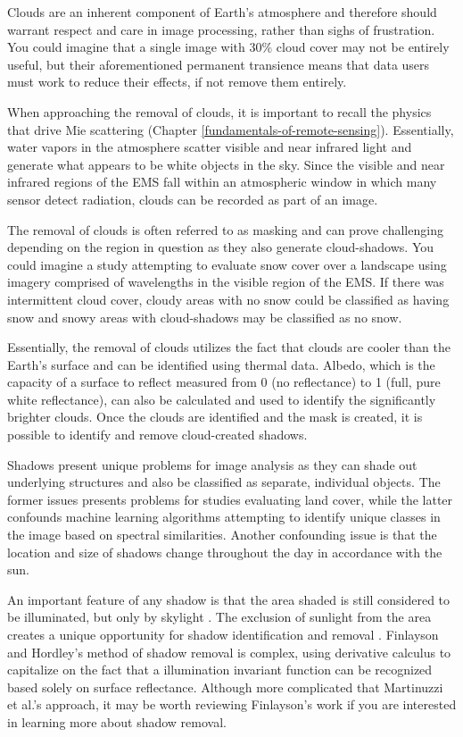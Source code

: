 \documentclass[
]{book}
\begin{document}
Clouds are an inherent component of Earth's atmosphere and therefore
should warrant respect and care in image processing, rather than sighs
of frustration. You could imagine that a single image with 30\% cloud
cover may not be entirely useful, but their aforementioned permanent
transience means that data users must work to reduce their effects, if
not remove them entirely.

When approaching the removal of clouds, it is important to recall the
physics that drive Mie scattering (Chapter
\ref{fundamentals-of-remote-sensing}). Essentially, water vapors in the
atmosphere scatter visible and near infrared light and generate what
appears to be white objects in the sky. Since the visible and near
infrared regions of the EMS fall within an atmospheric window in which
many sensor detect radiation, clouds can be recorded as part of an
image.

The removal of clouds is often referred to as masking and can prove
challenging depending on the region in question as they also generate
cloud-shadows. You could imagine a study attempting to evaluate snow
cover over a landscape using imagery comprised of wavelengths in the
visible region of the EMS. If there was intermittent cloud cover, cloudy
areas with no snow could be classified as having snow and snowy areas
with cloud-shadows may be classified as no snow.

Essentially, the removal of clouds utilizes the fact that clouds are
cooler than the Earth's surface and can be identified using thermal
data. Albedo, which is the capacity of a surface to reflect measured
from 0 (no reflectance) to 1 (full, pure white reflectance), can also be
calculated and used to identify the significantly brighter clouds. Once
the clouds are identified and the mask is created, it is possible to
identify and remove cloud-created shadows.

Shadows present unique problems for image analysis as they can shade out
underlying structures and also be classified as separate, individual
objects. The former issues presents problems for studies evaluating land
cover, while the latter confounds machine learning algorithms attempting
to identify unique classes in the image based on spectral similarities.
Another confounding issue is that the location and size of shadows
change throughout the day in accordance with the sun.

An important feature of any shadow is that the area shaded is still
considered to be illuminated, but only by skylight . The exclusion of
sunlight from the area creates a unique opportunity for shadow
identification and removal \citep{finlayson_color_2001}. Finlayson and Hordley's method
of shadow removal is complex, using derivative calculus to capitalize on
the fact that a illumination invariant function can be recognized based
solely on surface reflectance. Although more complicated that Martinuzzi
et al.'s approach, it may be worth reviewing Finlayson's work if
you are interested in learning more about shadow removal.
\end{document}
